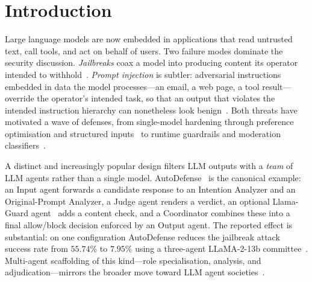 \section{Introduction}
\label{sec:intro}

Large language models are now embedded in applications that read untrusted text,
call tools, and act on behalf of users. Two failure modes dominate the security
discussion. \emph{Jailbreaks} coax a model into producing content its operator
intended to withhold~\cite{zou2023universal,shen2023dan,chao2023pair,yi2024jailbreaksurvey}. \emph{Prompt
injection} is subtler: adversarial instructions embedded in data the model
processes—an email, a web page, a tool result—override the operator's intended task,
so that an output that violates the intended instruction hierarchy can nonetheless
look benign~\cite{greshake2023injection,liu2024formalizing,wallace2024instruction}.
Both threats have motivated a wave of defenses, from single-model hardening through
preference optimisation and structured
inputs~\cite{chen2025secalign,chen2024struq} to runtime guardrails and moderation
classifiers~\cite{inan2023llamaguard,rebedea2023nemo,markov2023holistic,zeng2024shieldgemma}.

A distinct and increasingly popular design filters LLM outputs with a \emph{team} of
LLM agents rather than a single model. AutoDefense~\cite{zeng2024autodefense} is the
canonical example: an Input agent forwards a candidate response to an Intention
Analyzer and an Original-Prompt Analyzer, a Judge agent renders a verdict, an optional
Llama-Guard agent~\cite{inan2023llamaguard} adds a content check, and a Coordinator
combines these into a final allow/block decision enforced by an Output agent. The
reported effect is substantial: on one configuration AutoDefense reduces the jailbreak
attack success rate from $55.74\%$ to $7.95\%$ using a three-agent LLaMA-2-13b
committee~\cite{zeng2024autodefense}. Multi-agent scaffolding of this kind—role
specialisation, analysis, and adjudication—mirrors the broader move toward LLM agent
societies~\cite{wu2023autogen,hong2023metagpt,li2023camel,qian2023chatdev,du2023debate,xi2023agentsurvey}.


